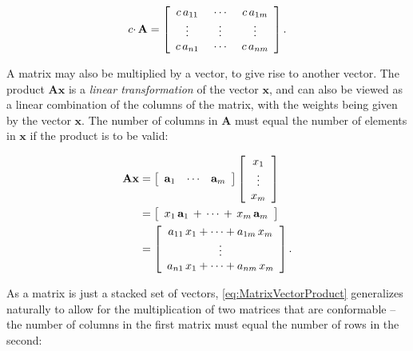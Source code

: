 \documentclass[graybox,envcountchap,sectrefs]{svmono}\usepackage[]{graphicx}\usepackage[]{xcolor}
\begin{document}
\begin{appendices}
\begin{equation}
c\cdotp\mathrm{\mathbf{A}}=\left[\begin{array}{ccc}
c\thinspace a_{11} & \ \cdots\  & c\thinspace a_{1m}\\
\vdots & \vdots & \vdots\\
c\thinspace a_{n1} & \ \cdots\  & c\thinspace a_{nm}
\end{array}\right].\label{eq:MatrixScaling}
\end{equation}

A matrix may also be multiplied by a vector, to give rise to another
vector. The product $\mathrm{\mathbf{Ax}}$ is a \emph{linear transformation}
of the vector $\mathrm{\mathbf{x}}$, and can also be viewed as a
linear combination of the columns of the matrix, with the weights
being given by the vector $\mathrm{\mathbf{x}}$. The number of columns
in $\mathrm{\mathbf{A}}$ must equal the number of elements in $\mathrm{\mathbf{x}}$
if the product is to be valid:

\begin{align}
\mathrm{\mathbf{Ax}} & =\left[\begin{array}{ccc}
\mathrm{\mathbf{a}}_{1} & \cdots & \mathrm{\mathbf{a}}_{m}\end{array}\right]\left[\begin{array}{c}
x_{1}\\
\vdots\\
x_{m}
\end{array}\right]\nonumber \\
 & =\left[\begin{array}{c}
x_{1}\,\mathrm{\mathbf{a}}_{1}\,+\,\cdots\,+\,x_{m}\,\mathrm{\mathbf{a}}_{m}\end{array}\right]\nonumber \\
 & =\left[\begin{array}{c}
a_{11}\thinspace x_{1}+\cdots+a_{1m}\thinspace x_{m}\\
\vdots\\
a_{n1}\thinspace x_{1}+\cdots+a_{nm}\thinspace x_{m}
\end{array}\right].\label{eq:MatrixVectorProduct}
\end{align}

As a matrix is just a stacked set of vectors, \eqref{eq:MatrixVectorProduct}
generalizes naturally to allow for the multiplication of two matrices
that are conformable -- the number of columns in the first matrix
must equal the number of rows in the second:


\end{appendices}
\end{document}
